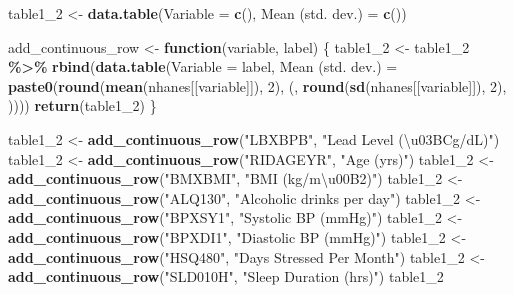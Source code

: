 \documentclass[
]{article}
\newenvironment{Shaded}{\begin{snugshade}}{\end{snugshade}}
\newcommand{\ControlFlowTok}[1]{\textcolor[rgb]{0.13,0.29,0.53}{\textbf{#1}}}
\newcommand{\DecValTok}[1]{\textcolor[rgb]{0.00,0.00,0.81}{#1}}
\newcommand{\FunctionTok}[1]{\textcolor[rgb]{0.13,0.29,0.53}{\textbf{#1}}}
\newcommand{\NormalTok}[1]{#1}
\newcommand{\OtherTok}[1]{\textcolor[rgb]{0.56,0.35,0.01}{#1}}
\newcommand{\SpecialCharTok}[1]{\textcolor[rgb]{0.81,0.36,0.00}{\textbf{#1}}}
\newcommand{\StringTok}[1]{\textcolor[rgb]{0.31,0.60,0.02}{#1}}
\begin{document}
\begin{Shaded}
\begin{Highlighting}[]
\NormalTok{table1\_2 }\OtherTok{\textless{}{-}} \FunctionTok{data.table}\NormalTok{(}\StringTok{\textquotesingle{}Variable\textquotesingle{}} \OtherTok{=} \FunctionTok{c}\NormalTok{(), }\StringTok{\textquotesingle{}Mean (std. dev.)\textquotesingle{}} \OtherTok{=} \FunctionTok{c}\NormalTok{())}

\NormalTok{add\_continuous\_row }\OtherTok{\textless{}{-}} \ControlFlowTok{function}\NormalTok{(variable, label) \{}
\NormalTok{  table1\_2 }\OtherTok{\textless{}{-}}\NormalTok{ table1\_2 }\SpecialCharTok{\%\textgreater{}\%} \FunctionTok{rbind}\NormalTok{(}\FunctionTok{data.table}\NormalTok{(}\StringTok{\textquotesingle{}Variable\textquotesingle{}} \OtherTok{=}\NormalTok{ label, }
                                        \StringTok{\textquotesingle{}Mean (std. dev.)\textquotesingle{}} \OtherTok{=} \FunctionTok{paste0}\NormalTok{(}\FunctionTok{round}\NormalTok{(}\FunctionTok{mean}\NormalTok{(nhanes[[variable]]), }\DecValTok{2}\NormalTok{), }\StringTok{\textquotesingle{} (\textquotesingle{}}\NormalTok{, }\FunctionTok{round}\NormalTok{(}\FunctionTok{sd}\NormalTok{(nhanes[[variable]]), }\DecValTok{2}\NormalTok{), }\StringTok{\textquotesingle{})\textquotesingle{}}\NormalTok{)))}
  \FunctionTok{return}\NormalTok{(table1\_2)}
\NormalTok{\}}

\NormalTok{table1\_2 }\OtherTok{\textless{}{-}} \FunctionTok{add\_continuous\_row}\NormalTok{(}\StringTok{"LBXBPB"}\NormalTok{, }\StringTok{"Lead Level (\textbackslash{}u03BCg/dL)"}\NormalTok{)}
\NormalTok{table1\_2 }\OtherTok{\textless{}{-}} \FunctionTok{add\_continuous\_row}\NormalTok{(}\StringTok{"RIDAGEYR"}\NormalTok{, }\StringTok{"Age (yrs)"}\NormalTok{)}
\NormalTok{table1\_2 }\OtherTok{\textless{}{-}} \FunctionTok{add\_continuous\_row}\NormalTok{(}\StringTok{"BMXBMI"}\NormalTok{, }\StringTok{"BMI (kg/m\textbackslash{}u00B2)"}\NormalTok{)}
\NormalTok{table1\_2 }\OtherTok{\textless{}{-}} \FunctionTok{add\_continuous\_row}\NormalTok{(}\StringTok{"ALQ130"}\NormalTok{, }\StringTok{"Alcoholic drinks per day"}\NormalTok{)}
\NormalTok{table1\_2 }\OtherTok{\textless{}{-}} \FunctionTok{add\_continuous\_row}\NormalTok{(}\StringTok{"BPXSY1"}\NormalTok{, }\StringTok{"Systolic BP (mmHg)"}\NormalTok{)}
\NormalTok{table1\_2 }\OtherTok{\textless{}{-}} \FunctionTok{add\_continuous\_row}\NormalTok{(}\StringTok{"BPXDI1"}\NormalTok{, }\StringTok{"Diastolic BP (mmHg)"}\NormalTok{)}
\NormalTok{table1\_2 }\OtherTok{\textless{}{-}} \FunctionTok{add\_continuous\_row}\NormalTok{(}\StringTok{"HSQ480"}\NormalTok{, }\StringTok{"Days Stressed Per Month"}\NormalTok{)}
\NormalTok{table1\_2 }\OtherTok{\textless{}{-}} \FunctionTok{add\_continuous\_row}\NormalTok{(}\StringTok{"SLD010H"}\NormalTok{, }\StringTok{"Sleep Duration (hrs)"}\NormalTok{)}
\NormalTok{table1\_2}
\end{Highlighting}
\end{Shaded}
\end{document}
